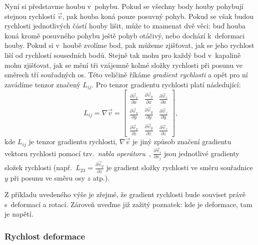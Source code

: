\documentclass[12pt]{article}
\begin{document}
Nyní si představme houbu v~pohybu. Pokud se všechny body houby pohybují stejnou rychlostí $\vec v$, pak houba koná pouze posuvný pohyb. Pokud se však budou rychlosti jednotlivých částí houby lišit, může to znamenat dvě věci: buď houba koná kromě posuvného pohybu ještě pohyb otáčivý, nebo dochází k~deformaci houby. Pokud si v~houbě zvolíme bod, pak můžeme zjišťovat, jak se jeho rychlost liší od rychlostí sousedních bodů. Stejně tak mohu pro každý bod v~kapalině mohu zjišťovat, jak se mění tři vzájemně kolmé složky rychlosti při posunu ve směrech tří souřadných os. Této veličině říkáme \emph{gradient rychlosti} a opět pro ní zavádíme tenzor značený $L_{ij}$. Pro tenzor gradientu rychlosti platí následující:
\begin{equation}
    L_{ij} = \nabla\vec v =
    \begin{bmatrix}
        \frac{\partial \vec{v}_x}{\partial x} & \frac{\partial \vec{v}_y}{\partial x} & \frac{\partial \vec{v}_z}{\partial x}\\
        \frac{\partial \vec{v}_x}{\partial y} & \frac{\partial \vec{v}_y}{\partial y} & \frac{\partial \vec{v}_z}{\partial y}\\
        \frac{\partial \vec{v}_x}{\partial z} & \frac{\partial \vec{v}_y}{\partial z} & \frac{\partial \vec{v}_z}{\partial z}
    \end{bmatrix}
    \text{,}
    \label{eq:tenzor_grad_rychlosti}
\end{equation}
kde $L_{ij}$ je tenzor gradientu rychlosti, $\nabla\vec v$ je jiný způsob značení gradientu vektoru rychlosti pomocí tzv.~\emph{nabla operátoru}~\cite{wiki:Nabla}, $\frac{\partial \vec{v}_i}{\partial x_j}$ jsou jednotlivé gradienty složek rychlosti (např.~$L_{23} = \frac{\partial \vec{v}_y}{\partial z}$ je gradient složky rychlosti ve směru souřadnice $y$ při posunu ve směru osy $z$ atp.).~\cite{wiki:Strain_rate_tensor}
\par
Z příkladu uvedeného výše je zřejmé, že gradient rychlosti bude souviset právě s~deformací a rotací. Zároveň uveďme již zažitý poznatek: kde je deformace, tam je napětí.

\subsubsection{Rychlost deformace}%
\end{document}
